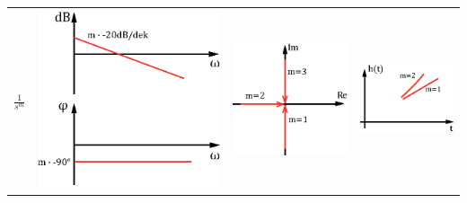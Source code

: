 \begin{tabular}{>{\centering\arraybackslash}p{1.5cm}|>{\centering\arraybackslash}p{2.5cm}|>{\centering\arraybackslash}p{2cm}|>{\centering\arraybackslash}p{2.5cm}}
\hline \rule[-2ex]{0pt}{5.5ex} $\frac{1}{s^m}$ & \includegraphics[scale = 0.3]{images/bode_sm.eps}  & \includegraphics[scale = 0.4]{images/ort_sm.eps}  & \includegraphics[scale = 0.5]{images/spr_sm.eps} \\ 

\end{tabular}
